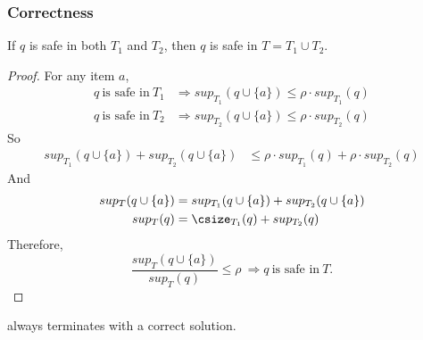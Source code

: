 \subsubsection{Correctness}
\begin{lemma}%
\label{CorrectnessOfPartitioning}
  If $q$ is safe in both $T_1$ and $T_2$, then $q$ is safe in $T = T_1 \cup T_2$.
\end{lemma}
\begin{proof}
For any item $a$,
  \begin{align*}
   q~\text{is safe in}~T_1 &\Rightarrow sup_{T_1}(q\cup\{a\}) \le \rho\cdot sup_{T_1}(q) \\
   q~\text{is safe in}~T_2 &\Rightarrow sup_{T_2}(q\cup\{a\}) \le \rho\cdot sup_{T_2}(q)
  \end{align*}
  So \begin{align*}
   sup_{T_1}(q\cup\{a\}) + sup_{T_2}(q\cup\{a\}) &\le \rho\cdot sup_{T_1}(q) + \rho\cdot sup_{T_2}(q)
  \end{align*}
  And \begin{align*}
    sup_T(q\cup\{a\}) &= sup_{T_1}(q\cup\{a\}) + sup_{T_2}(q\cup\{a\}) \\
    sup_T(q) &= \csize_{T_1}(q) + sup_{T_2}(q)
  \end{align*}
  Therefore, $$ \frac{sup_T(q\cup\{a\})}{sup_T(q)} \le \rho~\Rightarrow q~\text{is safe in}~T .$$
\end{proof}
\begin{theorem}
\label{CorrectnessOfPartialSuppression}
  \PartialSuppression always terminates with a correct solution.
\end{theorem}
